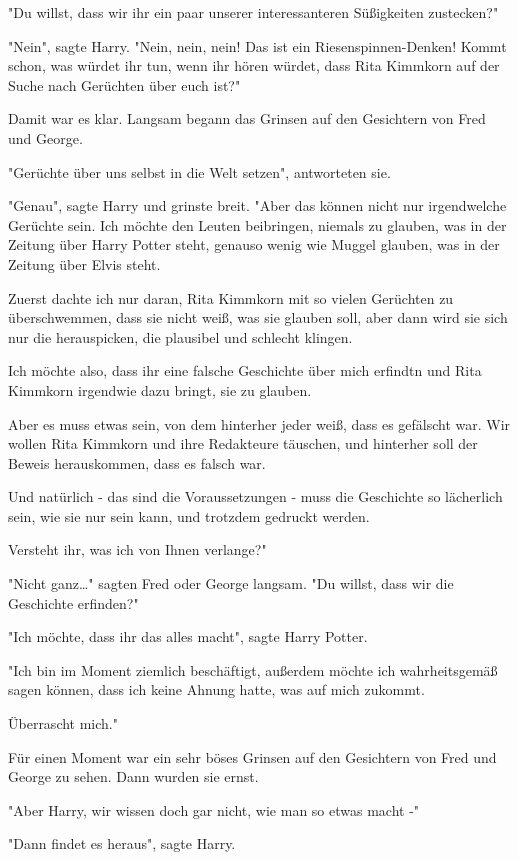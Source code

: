 {"Du willst, dass wir ihr ein paar unserer interessanteren Süßigkeiten zustecken?"

"Nein", sagte Harry. "Nein, nein, nein! Das ist ein Riesenspinnen-Denken! Kommt schon, was würdet ihr tun, wenn ihr hören würdet, dass Rita Kimmkorn auf der Suche nach Gerüchten über euch ist?"

Damit war es klar. Langsam begann das Grinsen auf den Gesichtern von Fred und George.

"Gerüchte über uns selbst in die Welt setzen", antworteten sie.

"Genau", sagte Harry und grinste breit. "Aber das können nicht nur irgendwelche Gerüchte sein. Ich möchte den Leuten beibringen, niemals zu glauben, was in der Zeitung über Harry Potter steht, genauso wenig wie Muggel glauben, was in der Zeitung über Elvis steht.

Zuerst dachte ich nur daran, Rita Kimmkorn mit so vielen Gerüchten zu überschwemmen, dass sie nicht weiß, was sie glauben soll, aber dann wird sie sich nur die herauspicken, die plausibel und schlecht klingen.

Ich möchte also, dass ihr eine falsche Geschichte über mich erfindtn und Rita Kimmkorn irgendwie dazu bringt, sie zu glauben.

Aber es muss etwas sein, von dem hinterher jeder weiß, dass es gefälscht war. Wir wollen Rita Kimmkorn und ihre Redakteure täuschen, und hinterher soll der Beweis herauskommen, dass es falsch war.

Und natürlich - das sind die Voraussetzungen - muss die Geschichte so lächerlich sein, wie sie nur sein kann, und trotzdem gedruckt werden.

Versteht ihr, was ich von Ihnen verlange?"

"Nicht ganz…" sagten Fred oder George langsam. "Du willst, dass wir die Geschichte erfinden?"

"Ich möchte, dass ihr das alles macht", sagte Harry Potter.

"Ich bin im Moment ziemlich beschäftigt, außerdem möchte ich wahrheitsgemäß sagen können, dass ich keine Ahnung hatte, was auf mich zukommt.

Überrascht mich."

Für einen Moment war ein sehr böses Grinsen auf den Gesichtern von Fred und George zu sehen. Dann wurden sie ernst.

"Aber Harry, wir wissen doch gar nicht, wie man so etwas macht -"

"Dann findet es heraus", sagte Harry.

}
